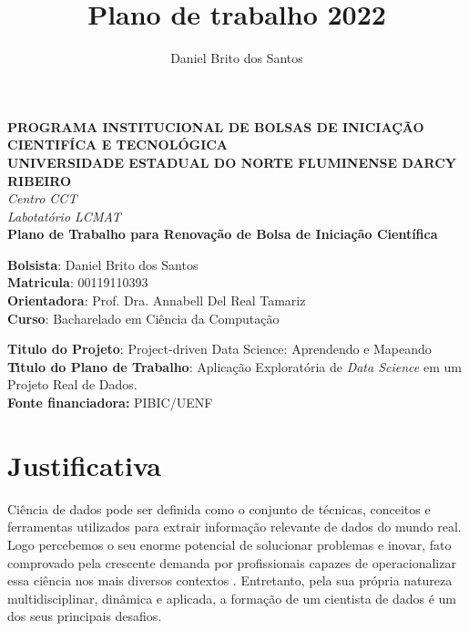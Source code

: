 \documentclass{article}
\title{Plano de trabalho 2022}
\author{Daniel Brito dos Santos}
\begin{document}
\begin{titlepage}
\begin{center}
\large
\textbf{PROGRAMA INSTITUCIONAL DE BOLSAS DE INICIA\c{C}\~{A}O CIENTIF\'{I}CA E TECNOL\'{O}GICA\\\vspace{0,5cm}
UNIVERSIDADE ESTADUAL DO NORTE FLUMINENSE DARCY RIBEIRO\\
}
\textit{Centro CCT \\
Labotat\'{o}rio LCMAT\\
\vspace{1cm}}
\vspace{1,5cm}
\textbf{Plano de Trabalho para Renovação de Bolsa de Iniciação Científica}\\\vspace{5cm}
\end{center}
\textbf{Bolsista}: Daniel Brito dos Santos\\
\textbf{Matricula}: 00119110393\\
\textbf{Orientadora}: Prof. Dra. Annabell Del Real Tamariz  \\
\textbf{Curso}: Bacharelado em Ci\^{e}ncia da Computa\c{c}\~{a}o\\
\vspace{3cm}
\begin{center}
\textbf{Titulo do Projeto}: Project-driven Data Science: Aprendendo e Mapeando\\
\textbf{T\'{\i}tulo do Plano de Trabalho}: Aplicação Exploratória de \textit{Data Science} em um Projeto Real de Dados.\\
\textbf{Fonte financiadora:} PIBIC/UENF
\end{center}
\end{titlepage}


\section{Justificativa}
Ciência de dados pode ser definida como o conjunto de técnicas, conceitos e ferramentas utilizados para extrair informação relevante de dados do mundo real. Logo percebemos o seu enorme potencial de solucionar problemas e inovar, fato comprovado pela crescente demanda por profissionais capazes de operacionalizar essa ciência nos mais diversos contextos \cite{DSmktshare}. Entretanto, pela sua própria natureza multidisciplinar, dinâmica e aplicada, a formação de um cientista de dados é um dos seus principais desafios.
\end{document}
